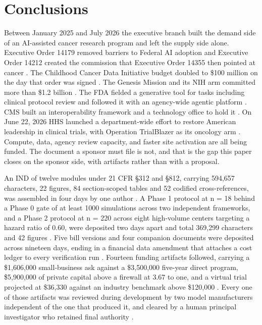 \section{Conclusions}
\label{sec:conclusions}

Between January 2025 and July 2026 the executive branch built the demand side of
an AI-assisted cancer research program and left the supply side alone. Executive
Order 14179 removed barriers to Federal AI adoption and Executive Order 14212
created the commission that Executive Order 14355 then pointed at cancer
\cite{eo14179, eo14212, eo14355}. The Childhood Cancer Data Initiative budget
doubled to \$100 million on the day that order was signed \cite{ccdidoubling_nih}.
The Genesis Mission and its NIH arm committed more than \$1.2 billion
\cite{eo14363, biogenesis_nih}. The FDA fielded a generative tool for tasks
including clinical protocol review and followed it with an agency-wide agentic
platform \cite{crs_ai_healthcare, hhs_ai_strategy}. CMS built an
interoperability framework and a technology office to hold it
\cite{cms_healthtech, cms_office_healthtech}. On June 22, 2026 HHS launched a
department-wide effort to restore American leadership in clinical trials, with
Operation TrialBlazer as its oncology arm \cite{trialblazer, hhstrialblazer2026}.
Compute, data, agency review capacity, and faster site activation are all being
funded. The document a sponsor must file is not, and that is the gap this paper
closes on the sponsor side, with artifacts rather than with a proposal.

An IND of twelve modules under 21 CFR \S 312 and \S 812, carrying 594,657
characters, 22 figures, 84 section-scoped tables and 52 codified
cross-references, was assembled in four days by one author \cite{phase1ind}. A
Phase 1 protocol at n = 18 behind a Phase 0 gate of at least 1000 simulations
across two independent frameworks, and a Phase 2 protocol at n = 220 across
eight high-volume centers targeting a hazard ratio of 0.60, were deposited two
days apart and total 369,299 characters and 42 figures
\cite{onpremwhippl, phase2proto}. Five bill versions and four companion
documents were deposited across nineteen days, ending in a financial data
amendment that attaches a cost ledger to every verification run
\cite{hr9510billv5, clintrust, congressvote}. Fourteen funding artifacts
followed, carrying a \$1,606,000 small-business ask against a \$3,500,000
five-year direct program, \$5,900,000 of private capital above a firewall at
3.67 to one, and a virtual trial projected at \$36,330 against an industry
benchmark above \$120,000
\cite{capplan2026, tenapps2026, rfarm27001v2}. Every one of those artifacts was
reviewed during development by two model manufacturers independent of the one
that produced it, and cleared by a human principal investigator who retained
final authority \cite{aiprgliomatc, rfarm27001v2}.


